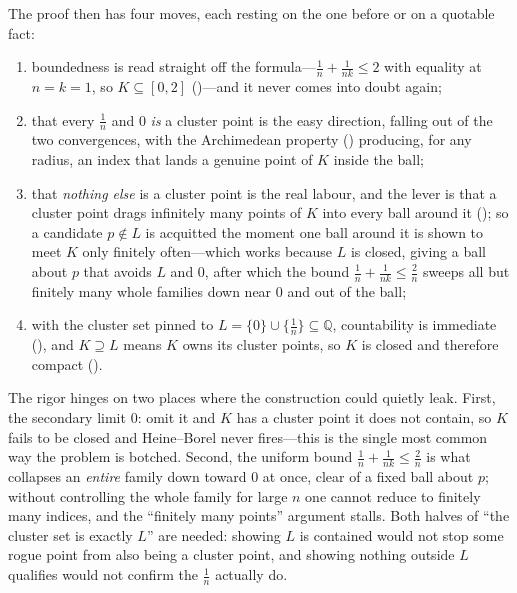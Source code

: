 \documentclass[main.tex]{subfiles}
\begin{document}
\begin{Reflection}
The proof then has four moves, each resting on the one before or on a quotable fact:
\begin{enumerate}[leftmargin=1.7em,itemsep=3pt,topsep=2pt,label=\textnormal{(\arabic*)}]
  \item boundedness is read straight off the formula---$\tfrac1n+\tfrac1{nk}\le 2$ with equality at
        $n=k=1$, so $K\subseteq[0,2]$ ()---and it never comes into doubt again;
  \item that every $\tfrac1n$ and $0$ \emph{is} a cluster point is the easy direction, falling out of the
        two convergences, with the Archimedean property () producing, for
        any radius, an index that lands a genuine point of $K$ inside the ball;
  \item that \emph{nothing else} is a cluster point is the real labour, and the lever is that a cluster
        point drags infinitely many points of $K$ into every ball around it
        (); so a candidate
        $p\notin L$ is acquitted the moment one ball around it is shown to meet $K$ only finitely
        often---which works because $L$ is closed, giving a ball about $p$ that avoids $L$ and $0$, after
        which the bound $\tfrac1n+\tfrac1{nk}\le\tfrac2n$ sweeps all but finitely many whole families down
        near $0$ and out of the ball;
  \item with the cluster set pinned to $L=\{0\}\cup\{\tfrac1n\}\subseteq\mathbb Q$, countability is immediate
        (), and $K\supseteq L$ means $K$
        owns its cluster points, so $K$ is closed and therefore compact ().
\end{enumerate}

The rigor hinges on two places where the construction could quietly leak. First, the secondary limit $0$:
omit it and $K$ has a cluster point it does not contain, so $K$ fails to be closed and Heine--Borel never
fires---this is the single most common way the problem is botched. Second, the uniform bound
$\tfrac1n+\tfrac1{nk}\le\tfrac2n$ is what collapses an \emph{entire} family down toward $0$ at once, clear of a
fixed ball about $p$; without controlling the whole family for large $n$ one cannot reduce to finitely many
indices, and the ``finitely many points'' argument stalls. Both halves of ``the cluster set is exactly $L$'' are needed:
showing $L$ is contained would not stop some rogue point from also being a cluster point, and showing nothing
outside $L$ qualifies would not confirm the $\tfrac1n$ actually do.


\end{Reflection}
\end{document}
